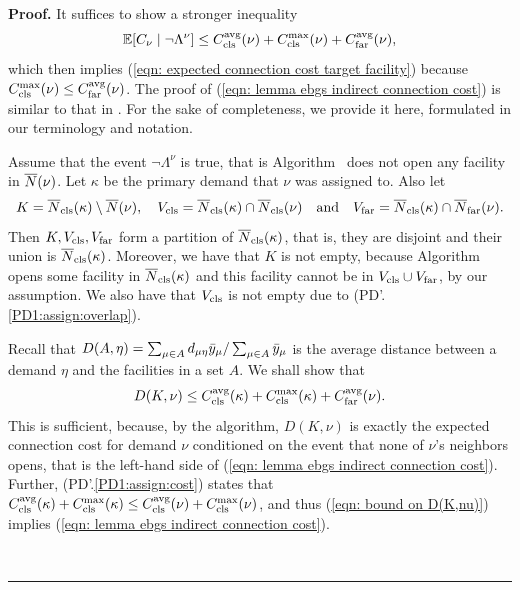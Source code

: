 \documentclass[oneside,final]{ucr}
\newenvironment{proof}[1][Proof]{\textbf{#1.} }{\ \rule{0.5em}{0.5em}}
\begin{document}
\begin{proof}
It suffices to show a stronger inequality
\begin{equation}
  \mathbb{E}[C_{\nu} \mid \neg \Lambda^{\nu}] \leq
  C_{{\mbox{\scriptsize\rm cls}}}^{{\mbox{\scriptsize\rm avg}}}(\nu) + C_{{\mbox{\scriptsize\rm cls}}}^{\max}(\nu) + C_{{\mbox{\scriptsize\rm far}}}^{{\mbox{\scriptsize\rm avg}}}(\nu)
			\label{eqn: lemma ebgs indirect connection cost},
\end{equation}
which then implies (\ref{eqn: expected connection cost
  target facility}) because $C_{{\mbox{\scriptsize\rm cls}}}^{\max}(\nu) \leq
C_{{\mbox{\scriptsize\rm far}}}^{{\mbox{\scriptsize\rm avg}}}(\nu)$.  The proof of (\ref{eqn: lemma ebgs indirect
  connection cost}) is similar to that in
\cite{ByrkaA10}. For the sake of completeness, we provide it
here, formulated in our terminology and notation.

Assume that the event $\neg \Lambda^{\nu}$ is true, that is Algorithm~{\EBGS}
does not open any facility in ${\overline{N}}(\nu)$.
Let $\kappa$ be the primary demand that $\nu$ was assigned to. Also let
\begin{equation*}
K = {\overline{N}}_{{\mbox{\scriptsize\rm cls}}}(\kappa) \setminus {\overline{N}}(\nu), \quad
V_{{\mbox{\scriptsize\rm cls}}} = {\overline{N}}_{{\mbox{\scriptsize\rm cls}}}(\kappa) \cap {\overline{N}}_{{\mbox{\scriptsize\rm cls}}}(\nu) \quad \textrm{and}\quad 
V_{{\mbox{\scriptsize\rm far}}} = {\overline{N}}_{{\mbox{\scriptsize\rm cls}}}(\kappa) \cap {\overline{N}}_{{\mbox{\scriptsize\rm far}}}(\nu).
\end{equation*}
% 
Then $K, V_{{\mbox{\scriptsize\rm cls}}}, V_{{\mbox{\scriptsize\rm far}}}$ form a partition of
${\overline{N}}_{{\mbox{\scriptsize\rm cls}}}(\kappa)$, that is, they are disjoint and their union is ${\overline{N}}_{{\mbox{\scriptsize\rm cls}}}(\kappa)$.
Moreover, we have that $K$ is not empty, because Algorithm~{\EBGS}
opens some facility in ${\overline{N}}_{{\mbox{\scriptsize\rm cls}}}(\kappa)$ and this facility cannot be in $V_{{\mbox{\scriptsize\rm cls}}}\cup V_{{\mbox{\scriptsize\rm far}}}$,
by our assumption. 
We also have that $V_{{\mbox{\scriptsize\rm cls}}}$ is not empty due to (PD'.\ref{PD1:assign:overlap}). 

Recall that $D(A,\eta) = \sum_{\mu\in A}d_{\mu\eta}{\bar y}_{\mu}/\sum_{\mu\in A}{\bar y}_{\mu}$
is the average distance between a demand $\eta$ and the facilities in a set $A$. We shall show that
%
\begin{equation}
	 D(K, \nu) \leq C_{{\mbox{\scriptsize\rm cls}}}^{{\mbox{\scriptsize\rm avg}}}(\kappa)+C_{{\mbox{\scriptsize\rm cls}}}^{\max}(\kappa) + C_{{\mbox{\scriptsize\rm far}}}^{{\mbox{\scriptsize\rm avg}}}(\nu).
				\label{eqn: bound on D(K,nu)}
\end{equation}
%
This is sufficient, because, by the algorithm, $D(K,\nu)$ is exactly 
the expected connection cost for demand $\nu$ conditioned on
the event that none of $\nu$'s neighbors 
opens, that is the left-hand side of (\ref{eqn: lemma ebgs indirect connection cost}).
Further, (PD'.\ref{PD1:assign:cost}) states that 
$C_{{\mbox{\scriptsize\rm cls}}}^{{\mbox{\scriptsize\rm avg}}}(\kappa)+C_{{\mbox{\scriptsize\rm cls}}}^{\max}(\kappa) \le C_{{\mbox{\scriptsize\rm cls}}}^{{\mbox{\scriptsize\rm avg}}}(\nu) + C_{{\mbox{\scriptsize\rm cls}}}^{\max}(\nu)$, and thus
(\ref{eqn: bound on D(K,nu)})  implies (\ref{eqn: lemma ebgs indirect connection cost}).

\medskip


\end{proof}
\end{document}
